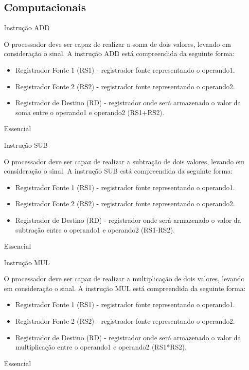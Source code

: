 \documentclass{article}
\begin{document}
    \subsection{Computacionais}
    \begin{functional}

     \requirement
      {Instrução ADD}
      {O processador deve ser capaz de realizar a soma de dois valores, levando em consideração o sinal.
      A instrução ADD está compreendida da seguinte forma:\\
       \begin{itemize}
        \item Registrador Fonte 1 (RS1) - registrador fonte representando o operando1.
        \item Registrador Fonte 2 (RS2) - registrador fonte representando o operando2.
        \item Registrador de Destino (RD) - registrador onde será armazenado o valor da soma entre o operando1 e operando2 (RS1+RS2).
       \end{itemize}
       }
      {Essencial}

     \requirement
      {Instrução SUB}
      {O processador deve ser capaz de realizar a subtração de dois valores, levando em consideração o sinal.
      A instrução SUB está compreendida da seguinte forma:\\
       \begin{itemize}
        \item Registrador Fonte 1 (RS1) - registrador fonte representando o operando1.
        \item Registrador Fonte 2 (RS2) - registrador fonte representando o operando2.
        \item Registrador de Destino (RD) - registrador onde será armazenado o valor da subtração entre o operando1 e operando2 (RS1-RS2).
       \end{itemize}
       }
      {Essencial}

      \requirement
      {Instrução MUL}
      {O processador deve ser capaz de realizar a multiplicação de dois valores, levando em consideração o sinal.
      A instrução MUL está compreendida da seguinte forma:\\
       \begin{itemize}
        \item Registrador Fonte 1 (RS1) - registrador fonte representando o operando1.
        \item Registrador Fonte 2 (RS2) - registrador fonte representando o operando2.
        \item Registrador de Destino (RD) - registrador onde será armazenado o valor da multiplicação entre o operando1 e operando2 (RS1*RS2).
       \end{itemize}
       }
      {Essencial}


\end{functional}
\end{document}
